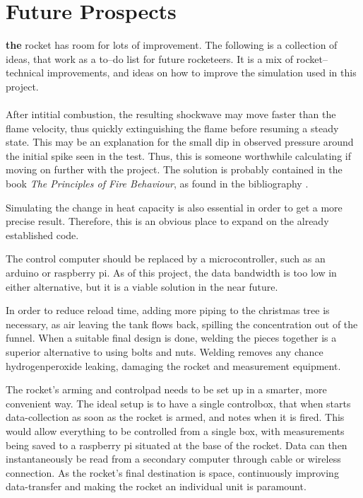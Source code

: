 \chapter{Future Prospects}\label{cha:perspective}


\textbf{the} rocket has room for lots of improvement. The following is a collection of ideas, that work as a to--do list for future rocketeers. It is a mix of rocket--technical improvements, and ideas on how to improve the simulation used in this project.
\\
\\

After intitial combustion, the resulting shockwave may move faster than the flame velocity, thus quickly extinguishing the flame before resuming a steady state. This may be an explanation for the small dip in observed pressure around the initial spike seen in the test. Thus, this is someone worthwhile calculating if moving on further with the project. The solution is probably contained in the book \emph{The Principles of Fire Behaviour}, as found in the bibliography \cite{principlesoffire}.

Simulating the change in heat capacity is also essential in order to get a more precise result. Therefore, this is an obvious place to expand on the already established code.

The control computer should be replaced by a microcontroller, such as an arduino or raspberry pi. As of this project, the data bandwidth is too low in either alternative, but it is a viable solution in the near future.

In order to reduce reload time, adding more piping to the christmas tree is necessary, as air leaving the  tank flows back, spilling the  concentration out of the funnel. When a suitable final design is done, welding the pieces together is a superior alternative to using bolts and nuts. Welding removes any chance hydrogenperoxide leaking, damaging the rocket and measurement equipment.

The rocket's arming and controlpad needs to be set up in a smarter, more convenient way. The ideal setup is to have a single controlbox, that when starts data-collection as soon as the rocket is armed, and notes when it is fired. This would allow everything to be controlled from a single box, with measurements being saved to a raspberry pi situated at the base of the rocket. Data can then instantaneously be read from a secondary computer through cable or wireless connection. As the rocket's final destination is space, continuously improving data-transfer and making the rocket an individual unit is paramount.

